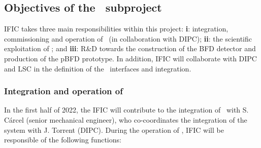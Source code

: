 \subsection{Objectives of the \sIFIC\ subproject}
\label{sec.obj.ific}


\indent
IFIC takes three main responsibilities within this project: {\bf i}: integration, commissioning and operation of \Next\ (in collaboration with DIPC); {\bf ii}: the scientific exploitation of \Next; and {\bf iii}: R\&D towards the construction of the BFD detector and production of the pBFD prototype. In addition, IFIC will collaborate with DIPC and LSC in the definition of the \NHD\ interfaces and integration.


\subsubsection*{Integration and operation of \Next}

In the first half of 2022, the IFIC will contribute to the integration of \Next\ with S. C\'arcel (senior mechanical engineer), who co-coordinates the integration of the system with J. Torrent (DIPC). 
During the operation of \Next, IFIC will be responsible of the following functions:

